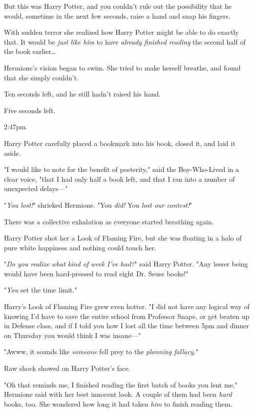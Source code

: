 But this was Harry Potter, and you couldn't rule out the possibility that he
would, sometime in the next few seconds, raise a hand and snap his fingers.

With sudden terror she realized how Harry Potter might be able to do exactly
that. It would be \emph{just like him} to have \emph{already finished reading}
the second half of the book earlier{\ldots}

Hermione's vision began to swim. She tried to make herself breathe, and found
that she simply couldn't.

Ten seconds left, and he still hadn't raised his hand.

Five seconds left.

2:47pm.

Harry Potter carefully placed a bookmark into his book, closed it, and laid it
aside.

"I would like to note for the benefit of posterity," said the Boy-Who-Lived in
a clear voice, "that I had only half a book left, and that I ran into a number
of unexpected delays---"

"\emph{You lost!}" shrieked Hermione. "You \emph{did!} You \emph{lost our
contest!}"

There was a collective exhalation as everyone started breathing again.

Harry Potter shot her a Look of Flaming Fire, but she was floating in a halo of
pure white happiness and nothing could touch her.

"\emph{Do you realize what kind of week I've had?}" said Harry Potter. "Any
lesser being would have been hard-pressed to read eight Dr. Seuss books!"

"\emph{You} set the time limit."

Harry's Look of Flaming Fire grew even hotter. "I did not have any logical way
of knowing I'd have to save the entire school from Professor Snape, or get
beaten up in Defense class, and if I told you how I lost all the time between
5pm and dinner on Thursday you would think I was insane---"

"Awww, it sounds like \emph{someone} fell prey to the \emph{planning fallacy.}"

Raw shock showed on Harry Potter's face.

"Oh that reminds me, I finished reading the first batch of books you lent me,"
Hermione said with her best innocent look. A couple of them had been
\emph{hard} books, too. She wondered how long it had taken \emph{him} to finish
reading them.

